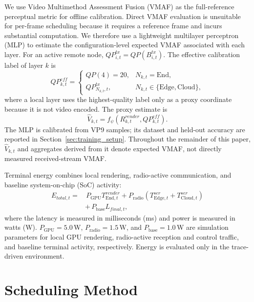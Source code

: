 \documentclass[10pt,journal,compsoc]{IEEEtran}
\begin{document}
We use Video Multimethod Assessment Fusion (VMAF) as the full-reference perceptual metric for offline calibration. Direct VMAF evaluation is unsuitable for per-frame scheduling because it requires a reference frame and incurs substantial computation. We therefore use a lightweight multilayer perceptron (MLP) to estimate the configuration-level expected VMAF associated with each layer. For an active remote node, $QP^{tx}_{i,t}=QP(B^{tx}_{i,t})$. The effective calibration label of layer $k$ is
\begin{equation}
	QP^{eff}_{k,t}=\begin{cases}
		QP(4)=20, & N_{k,t}=\mathrm{End},\\
		QP^{tx}_{N_{k,t},t}, & N_{k,t}\in\{\mathrm{Edge},\mathrm{Cloud}\},
	\end{cases}
	\label{eq:effective_qp}
\end{equation}
where a local layer uses the highest-quality label only as a proxy coordinate because it is not video encoded. The proxy estimate is
\begin{equation}
	\widehat V_{k,t}=f_{\psi}\!\left(R^{render}_{k,t},QP^{eff}_{k,t}\right).
	\label{eq:vmaf_proxy}
\end{equation}
The MLP is calibrated from VP9 samples; its dataset and held-out accuracy are reported in Section~\ref{sec:training_setup}. Throughout the remainder of this paper, $\widehat V_{k,t}$ and aggregates derived from it denote expected VMAF, not directly measured received-stream VMAF.

Terminal energy combines local rendering, radio-active communication, and baseline system-on-chip (SoC) activity:
\begin{equation}
\begin{aligned}
	E_{total,t}=&\,P_{\mathrm{GPU}}T^{render}_{\mathrm{End},t}
	+P_{\mathrm{radio}}\!\left(T^{ser}_{\mathrm{Edge},t}+T^{ser}_{\mathrm{Cloud},t}\right)\\
	&+\,P_{\mathrm{base}}L_{final,t},
\end{aligned}
	\label{eq:energy_model}
\end{equation}
where the latency is measured in milliseconds (ms) and power is measured in watts (W).
$P_{\mathrm{GPU}}=5.0$\,W, $P_{\mathrm{radio}}=1.5$\,W, and $P_{\mathrm{base}}=1.0$\,W are simulation parameters for local GPU rendering, radio-active reception and control traffic, and baseline terminal activity, respectively. Energy is evaluated only in the trace-driven environment.

\section{Scheduling Method}
\label{sec:scheduling_method}
\end{document}
